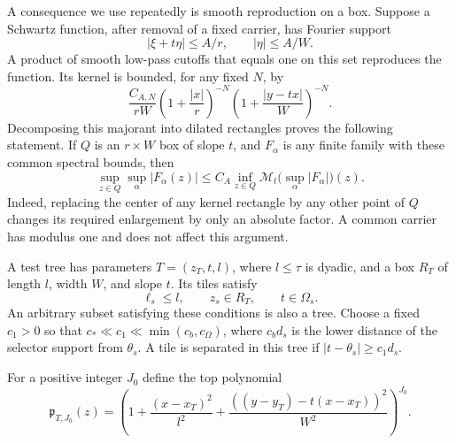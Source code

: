 A consequence we use repeatedly is smooth reproduction on a box.
Suppose a Schwartz function, after removal of a fixed carrier, has
Fourier support
\[
 |\xi+t\eta|\leq A/r,\qquad |\eta|\leq A/W.
\]
A product of smooth low-pass cutoffs that equals one on this set
reproduces the function.  Its kernel is bounded, for any fixed
\(N\), by
\[
 \frac{C_{A,N}}{rW}
 \left(1+\frac{|x|}{r}\right)^{-N}
 \left(1+\frac{|y-tx|}{W}\right)^{-N}.
\]
Decomposing this majorant into dilated rectangles proves the
following statement.  If \(Q\) is an \(r\times W\) box of slope
\(t\), and \(F_\alpha\) is any finite family with these common
spectral bounds, then
\begin{equation}\label{tile:eq-reproduction}
 \sup_{z\in Q}\sup_\alpha |F_\alpha(z)|
 \leq C_A\inf_{z\in Q}
             \mathcal M_t\bigl(\sup_\alpha|F_\alpha|\bigr)(z).
\end{equation}
Indeed, replacing the center of any kernel rectangle by any other
point of \(Q\) changes its required enlargement by only an absolute
factor.  A common carrier has modulus one and does not affect this
argument.

A test tree has parameters \(T=(z_T,t,l)\), where \(l\leq\tau\)
is dyadic, and a box \(R_T\) of length \(l\), width \(W\), and
slope \(t\).  Its tiles satisfy
\begin{equation}\label{tile:eq-tree}
 \ell_s\leq l,\qquad z_s\in R_T,\qquad t\in\Omega_s.
\end{equation}
An arbitrary subset satisfying these conditions is also a tree.
Choose a fixed \(c_1>0\) so that
\(c_*\ll c_1\ll\min(c_b,c_\Omega)\), where \(c_b d_s\) is the lower distance
of the selector support from \(\theta_s\).  A tile is separated
in this tree if \(|t-\theta_s|\geq c_1d_s\).

For a positive integer \(J_0\) define the top polynomial
\begin{equation}\label{tile:eq-top-polynomial}
 \mathfrak p_{T,J_0}(z)=
 \left(1+\frac{(x-x_T)^2}{l^2}
 +\frac{((y-y_T)-t(x-x_T))^2}{W^2}\right)^{J_0}.
\end{equation}

